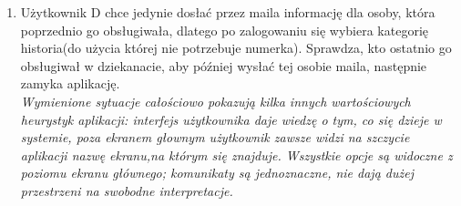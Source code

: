 \documentclass[12pt]{article}
\begin{document}
\begin {enumerate}
	\textit{Istnieje pomoc dla użytkownika zagubionego w gąszczu opcji; istnieje wyjście ratunkowe z niechcianej sytuacji.}\\
	
	
	\item Użytkownik D chce jedynie dosłać przez maila informację dla osoby, która poprzednio go obsługiwała, dlatego po zalogowaniu się wybiera kategorię historia(do użycia której nie potrzebuje numerka). Sprawdza, kto ostatnio go obsługiwał w dziekanacie, aby później wysłać tej osobie maila, następnie zamyka aplikację.\\
	
	\textit{Wymienione sytuacje całościowo pokazują kilka innych wartościowych heurystyk aplikacji: interfejs użytkownika daje wiedzę o tym, co się dzieje w systemie, poza ekranem głownym użytkownik zawsze widzi na szczycie aplikacji nazwę ekranu,na którym się znajduje. Wszystkie opcje są widoczne z poziomu ekranu głównego; komunikaty są jednoznaczne, nie dają dużej przestrzeni na swobodne interpretacje.}

\end{enumerate}
\end{document}
